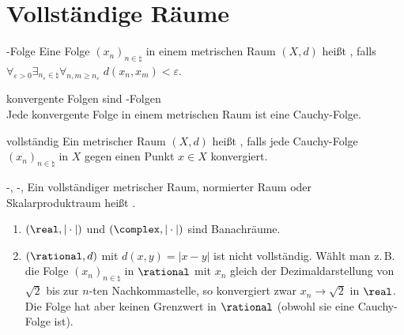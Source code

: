 \pagebreak

\section{%
    Vollständige Räume%
}

\begin{Def}{-Folge}
    Eine Folge $(x_n)_{n \in \natural}$ in einem metrischen Raum $(X, d)$ heißt
    , falls
    $\forall_{\varepsilon > 0} \exists_{n_\varepsilon \in \natural}
    \forall_{n, m \ge n_\varepsilon}\; d(x_n, x_m) < \varepsilon$.
\end{Def}

\begin{Lemma}{konvergente Folgen sind -Folgen}\\
    Jede konvergente Folge in einem metrischen Raum ist eine Cauchy-Folge.
\end{Lemma}

\begin{Def}{vollständig}
    Ein metrischer Raum $(X, d)$ heißt , falls jede Cauchy-Folge
    $(x_n)_{n \in \natural}$ in $X$ gegen einen Punkt $x \in X$ konvergiert.
\end{Def}

\begin{Def}{-, -, }
    Ein vollständiger metrischer Raum, normierter Raum oder Skalarproduktraum heißt
    .
\end{Def}

\begin{Bsp}
    \begin{enumerate}[label=\emph{(\alph*)}]
        \item
        $(\real, |\cdot|)$ und $(\complex, |\cdot|)$ sind Banachräume.

        \item
        $(\rational, d)$ mit $d(x, y) = |x - y|$ ist nicht vollständig.
        Wählt man z.\,B. die Folge $(x_n)_{n \in \natural}$ in $\rational$ mit
        $x_n$ gleich der Dezimaldarstellung von $\sqrt{2}$ bis zur $n$-ten Nachkommastelle,
        so konvergiert zwar $x_n \to \sqrt{2}$ in $\real$.
        Die Folge hat aber keinen Grenzwert in $\rational$ (obwohl sie eine Cauchy-Folge ist).
    \end{enumerate}
\end{Bsp}

\linie

